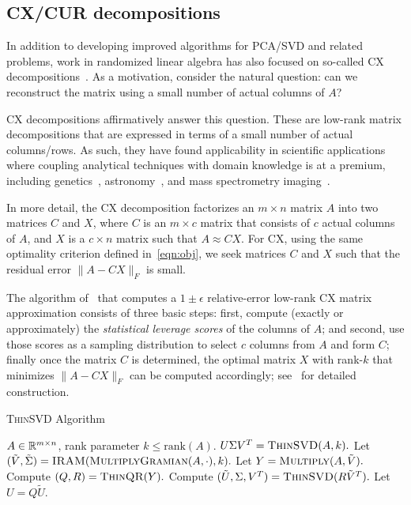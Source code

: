 \subsection{CX/CUR decompositions}

In addition to developing improved algorithms for PCA/SVD and related problems,
work in randomized linear algebra has also focused on so-called CX
decompositions~\cite{DMM08,CUR_PNAS}.  As a motivation, consider the natural
question: can we reconstruct the matrix using a small number of actual columns of
$A$?

CX decompositions affirmatively answer this question. These are
low-rank matrix decompositions that are expressed in terms of a small number of
actual columns/rows. As such, they have found applicability in scientific
applications where coupling analytical techniques with domain knowledge is at a
premium, including genetics~\cite{Paschou07b}, astronomy~\cite{Yip14-AJ}, and
mass spectrometry imaging~\cite{YRPMB15}.

In more detail, the CX decomposition factorizes an $m \times n$ matrix $A$ into two
matrices $C$ and $X$, where $C$ is an $m\times c$ matrix that consists of $c$
actual columns of $A$, and $X$ is a $c \times n$ matrix such that $A\approx
CX$.  
For CX, using the same optimality
criterion defined in~\eqref{eqn:obj}, we seek matrices $C$ and $X$ such that
the residual error $\|A-CX\|_F$ is small.

The algorithm of~\cite{DMM08} that computes a $1\pm\epsilon$ relative-error
low-rank CX matrix approximation consists of three basic steps: first, compute
(exactly or approximately) the {\it statistical leverage scores} of the columns
of $A$; and second, use those scores as a sampling distribution to select $c$
columns from $A$ and form $C$; finally once the matrix $C$ is determined, the
optimal matrix $X$ with rank-$k$ that minimizes $\|A-CX\|_F$ can be computed
accordingly; see~\cite{DMM08} for detailed construction. 

\begin{algorithm}[tb]
  \caption{\textsc{ThinSVD} Algorithm}
  \label{alg:thinSVD}
  \begin{algorithmic}[1]
    \Require $A \in \mathbb{R}^{m\times n}$, rank parameter $k \leq \textrm{rank}(A).$
    \Ensure $U \Sigma V^T = \textsc{ThinSVD}(A, k).$
    \State Let $(\tilde{V}, \tilde{\Sigma}) = \textsc{IRAM}(\textsc{MultiplyGramian}(A, \cdot), k).$
    \State Let $Y = \textsc{Multiply}(A, \tilde{V}).$
    \State Compute $(Q, R) = \textsc{ThinQR}(Y).$
    \State Compute $(\tilde{U}, \Sigma, V^T) = \textsc{ThinSVD}(R \tilde{V}^T).$
    \State Let $U = Q \tilde{U}.$  
  \end{algorithmic}
\end{algorithm}

